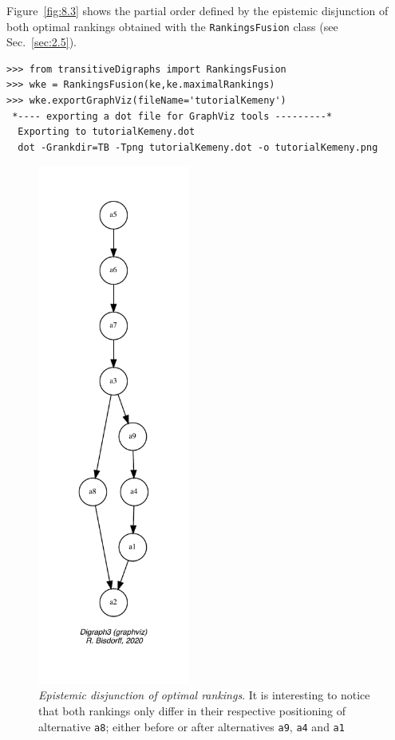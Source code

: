 Figure~\vref{fig:8.3} shows the partial order defined by the epistemic disjunction of both optimal \Kemeny rankings obtained with the \texttt{RankingsFu\-sion} class (see Sec.~\ref{sec:2.5}).
\begin{lstlisting}[caption={Computing the epistemic disjunction of all optimal \Kemeny rankings},label=list:8.10]   
>>> from transitiveDigraphs import RankingsFusion
>>> wke = RankingsFusion(ke,ke.maximalRankings)
>>> wke.exportGraphViz(fileName='tutorialKemeny')
 *---- exporting a dot file for GraphViz tools ---------*
  Exporting to tutorialKemeny.dot
  dot -Grankdir=TB -Tpng tutorialKemeny.dot -o tutorialKemeny.png
\end{lstlisting}
\begin{figure}[ht]
\sidecaption[t]
\includegraphics[width=5cm]{Figures/8-3-tutorialKemeny.pdf}
\caption[Epistemic disjunction of optimal \Kemeny rankings]{\emph{Epistemic disjunction of optimal \Kemeny rankings}. It is interesting to notice that both \Kemeny rankings only differ in their respective positioning of alternative \texttt{a8}; either before or after alternatives \texttt{a9}, \texttt{a4} and \texttt{a1}}
\label{fig:8.3}       %
\end{figure}


